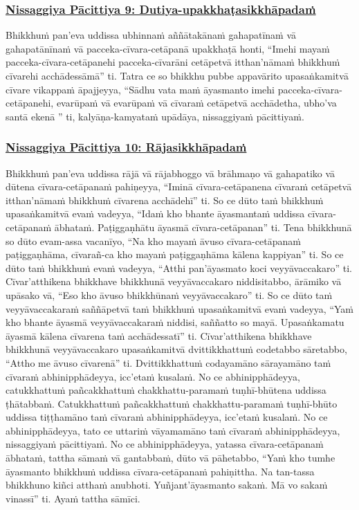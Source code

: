 \subsubsection*{\hyperref[forf-exp9]{Nissaggiya Pācittiya 9: Dutiya-upakkhaṭasikkhāpadaṁ}}
\label{np9}

Bhikkhuṁ pan'eva uddissa ubhinnaṁ aññātakānaṁ gahapatīnaṁ vā gahapatānīnaṁ vā pacceka-cīvara-cetāpanā upakkhaṭā honti, “Imehi mayaṁ pacceka-cīvara-cetāpanehi pacceka-cīvarāni cetāpetvā itthan'nāmaṁ bhikkhuṁ cīvarehi acchādessāmā” ti. Tatra ce so bhikkhu pubbe appavārito upasaṅkamitvā cīvare vikappaṁ āpajjeyya, “Sādhu vata maṁ āyasmanto imehi pacceka-cīvara-cetāpanehi, evarūpaṁ vā evarūpaṁ vā cīvaraṁ cetāpetvā acchādetha, ubho'va santā ekenā ” ti, kalyāṇa-kamyataṁ upādāya, nissaggiyaṁ pācittiyaṁ.

\subsubsection*{\hyperref[forf-exp10]{Nissaggiya Pācittiya 10: Rājasikkhāpadaṁ}}
\label{np10}

Bhikkhuṁ pan'eva uddissa rājā vā rājabhoggo vā brāhmaṇo vā gahapatiko vā dūtena cīvara-cetāpanaṁ pahiṇeyya, “Iminā cīvara-cetāpanena cīvaraṁ cetāpetvā itthan'nāmaṁ bhikkhuṁ cīvarena acchādehī” ti. So ce dūto taṁ bhikkhuṁ upasaṅkamitvā evaṁ vadeyya, “Idaṁ kho bhante āyasmantaṁ uddissa cīvara-cetāpanaṁ ābhataṁ. Paṭiggaṇhātu āyasmā cīvara-cetāpanan” ti. Tena bhikkhunā so dūto evam-assa vacanīyo, “Na kho mayaṁ āvuso cīvara-cetāpanaṁ paṭiggaṇhāma, cīvarañ-ca kho mayaṁ paṭiggaṇhāma kālena kappiyan” ti. So ce dūto taṁ bhikkhuṁ evaṁ vadeyya, “Atthi pan'āyasmato koci veyyāvaccakaro” ti. Cīvar'atthikena bhikkhave bhikkhunā veyyāvaccakaro niddisitabbo, ārāmiko vā upāsako vā, “Eso kho āvuso bhikkhūnaṁ veyyāvaccakaro” ti. So ce dūto taṁ veyyāvaccakaraṁ saññāpetvā taṁ bhikkhuṁ upasaṅkamitvā evaṁ vadeyya, “Yaṁ kho bhante āyasmā veyyāvaccakaraṁ niddisi, saññatto so mayā. Upasaṅkamatu āyasmā kālena cīvarena taṁ acchādessatī” ti. Cīvar'atthikena bhikkhave bhikkhunā veyyāvaccakaro upasaṅkamitvā dvittikkhattuṁ codetabbo sāretabbo, “Attho me āvuso cīvarenā” ti. Dvittikkhattuṁ codayamāno sārayamāno taṁ cīvaraṁ abhinipphādeyya, icc'etaṁ kusalaṁ. No ce abhinipphādeyya, catukkhattuṁ pañcakkhattuṁ chakkhattu-paramaṁ tuṇhī-bhūtena uddissa ṭhātabbaṁ. Catukkhattuṁ pañcakkhattuṁ chakkhattu-paramaṁ tuṇhī-bhūto uddissa tiṭṭhamāno taṁ cīvaraṁ abhinipphādeyya, icc'etaṁ kusalaṁ. No ce abhinipphādeyya, tato ce uttariṁ vāyamamāno taṁ cīvaraṁ abhinipphādeyya, nissaggiyaṁ pācittiyaṁ. No ce abhinipphādeyya, yatassa cīvara-cetāpanaṁ ābhataṁ, tattha sāmaṁ vā gantabbaṁ, dūto vā pāhetabbo, “Yaṁ kho tumhe āyasmanto bhikkhuṁ uddissa cīvara-cetāpanaṁ pahiṇittha. Na tan-tassa bhikkhuno kiñci atthaṁ anubhoti. Yuñjant'āyasmanto sakaṁ. Mā vo sakaṁ vinassī” ti. Ayaṁ tattha sāmīci.

